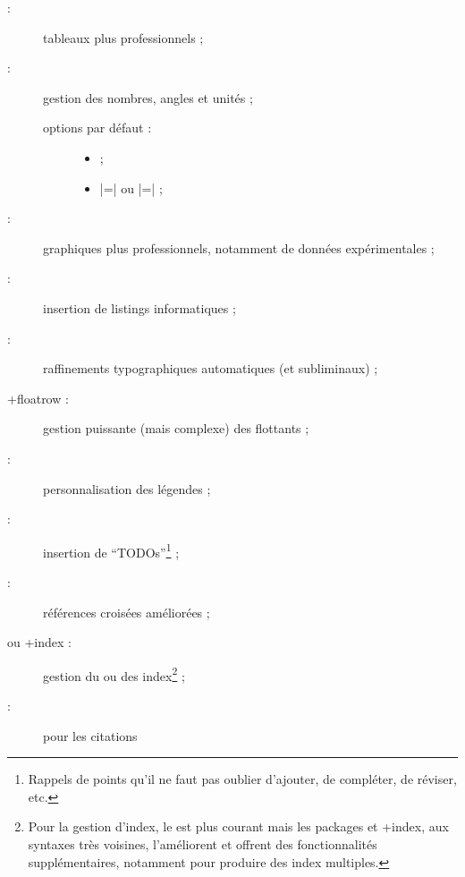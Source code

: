 \begin{description}
\item[ :] tableaux plus professionnels ;
\item[ :]
  gestion des nombres, angles et unités ;
  \begin{description}
  \item[options par défaut :]\leavevmode{}
    \begin{itemize}
    \item {} ;
    \item {}|=| ou
      |=| ;
    \end{itemize}
  \end{description}
\item[ :] graphiques plus professionnels,
  notamment de données expérimentales ;
\item[ :] insertion de listings
  informatiques ;
\item[ :] raffinements typographiques
  automatiques (et subliminaux) ;
\item[\package+{floatrow} :] gestion puissante (mais complexe) des
  flottants ;
\item[ :] personnalisation des légendes ;
\item[ :] insertion de
  \foreignquote{english}{TODOs}\footnote{Rappels de points qu'il ne
    faut pas oublier d'ajouter, de compléter, de réviser, etc.} ;
\item[ :] références croisées améliorées ;
\item[ ou \package*+{index} :] gestion du ou des
  index\footnote{Pour la gestion d'index, le  est plus courant
    mais les packages  et \package*+{index}, aux syntaxes très
    voisines, l'améliorent et offrent des fonctionnalités supplémentaires,
    notamment pour produire des index multiples.} ;
\item[ :] pour les citations

\end{description}
